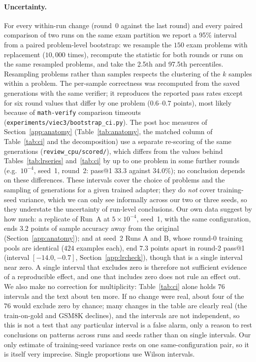 \documentclass[runningheads]{llncs}
\begin{document}
\paragraph{Uncertainty.} For every within-run change (round~0 against the last
round) and every paired comparison of two runs on the same exam partition we
report a 95\% interval from a paired problem-level bootstrap: we resample the
$150$ exam problems with replacement ($10{,}000$ times), recompute the statistic
for both rounds or runs on the same resampled problems, and take the 2.5th and
97.5th percentiles. Resampling problems rather than samples respects the
clustering of the $k$ samples within a problem. The per-sample correctness was
recomputed from the saved generations with the same verifier; it reproduces
the reported pass rates except for six round values that differ by one problem
($0.6$--$0.7$ points), most likely because of \texttt{math-verify} comparison
timeouts
(\texttt{experiments/viec3/bootstrap\_ci.py}). The post hoc measures of
Section~\ref{app:anatomy} (Table~\ref{tab:anatomy}, the matched column of
Table~\ref{tab:ci} and the decomposition) use a separate re-scoring of the same
generations (\texttt{review\_cpu/scored/}), which differs from the values behind
Tables~\ref{tab:lrseries} and~\ref{tab:ci} by up to one problem in some further
rounds (e.g.\ $10^{-4}$, seed~1, round~2: pass@1 $33.3$ against $34.0\%$); no
conclusion depends on these differences. These intervals cover the
choice of problems and the sampling of generations for a given trained adapter;
they do \emph{not} cover training-seed variance, which we can only see
informally across our two or three seeds, so they understate the uncertainty of
run-level conclusions. Our own data suggest by how much: a replicate of Run~A
at $5\times10^{-4}$, seed~1, with the same configuration, ends $3.2$ points of
sample accuracy away from the original (Section~\ref{app:anatomy}); and at
seed~2 Runs A and B, whose round-0 training pools are identical ($424$
examples each), end $7.3$ points apart in round-2 pass@1 (interval
$[-14.0,-0.7]$, Section~\ref{app:lrcheck}), though that is a single interval
near zero. A single interval that excludes zero is therefore not sufficient
evidence of a reproducible effect, and one that includes zero does not rule an
effect out. We also make no correction for multiplicity: Table~\ref{tab:ci}
alone holds $76$ intervals and the text about ten more. If no change were real,
about four of the $76$ would exclude zero by chance; many changes in the table
are clearly real (the train-on-gold and GSM8K declines), and the intervals are
not independent, so this is not a test that any particular interval is a false
alarm, only a reason to rest conclusions on patterns across runs and seeds
rather than on single intervals. Our only estimate of training-seed variance
rests on one same-configuration pair, so it is itself very imprecise. Single
proportions use Wilson intervals.
\end{document}
